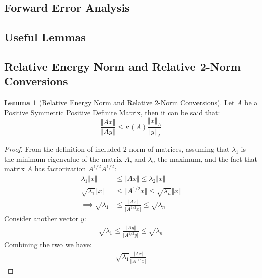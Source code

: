 \documentclass[]{article}
\theoremstyle{definition}
\newtheorem{lemma}{Lemma}[subsection]    %
\begin{document}
    \subsection{Forward Error Analysis}

\begin{appendices}
    
    \section{Useful Lemmas}
        \subsection{Relative Energy Norm and Relative 2-Norm Conversions}
        \begin{lemma}[Relative Energy Norm and Relative 2-Norm Conversions]\label{lemma:Relative_Energy_Norm_and_Relative_2_Norm_Conversions}
            Let $A$ be a Positive Symmetric Positive Definite Matrix, then it can be said that: 
            $$
            \frac{\Vert A x\Vert}{\Vert Ay \Vert} \le \kappa(A)\frac{\Vert 
            x\Vert_A}{\Vert y \Vert_A}
            $$
        \end{lemma}
        \begin{proof}
            From the definition of included 2-norm of matrices, assuming that $\lambda_1$ is the minimum eigenvalue of the matrix $A$, and $\lambda_n$ the maximum, and the fact that matrix $A$ has factorization $A^{1/2}A^{1/2}$: 
            \begin{align}
                \lambda_1 \Vert x \Vert 
                &\le \Vert Ax\Vert 
                \le \lambda_2 \Vert x\Vert
                \\
                \sqrt{\lambda_1} \Vert x\Vert 
                & \le \Vert A^{1/2}x\Vert \le \sqrt{\lambda_n}\Vert x \Vert
                \\
                \implies
                \sqrt{\lambda_1} & \le \frac{\Vert Ax\Vert}{\Vert A^{1/2}x \Vert} 
                \le \sqrt{\lambda_n}
            \end{align}
            Consider another vector $y$: 
            \begin{align}
                \sqrt{\lambda_1} \le \frac{\Vert Ay\Vert}{\Vert A^{1/2}y \Vert} \le \sqrt{\lambda_n}
            \end{align}
            Combining the two we have: 
            \begin{align}
                \sqrt{\lambda_1}\frac{\Vert Ax\Vert}{\Vert A^{1/2}x \Vert} 

\end{align}
\end{proof}
\end{appendices}
\end{document}
